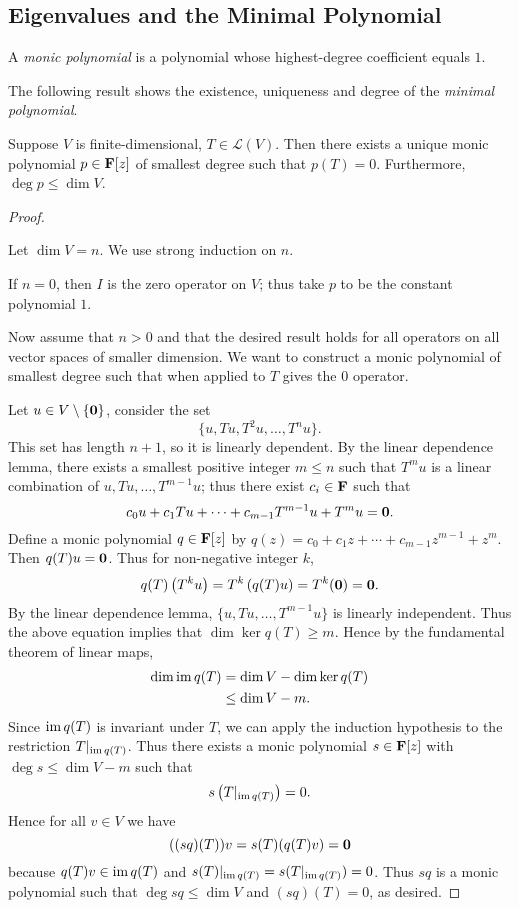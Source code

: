 \subsection{Eigenvalues and the Minimal Polynomial}
A \emph{monic polynomial} is a polynomial whose highest-degree coefficient equals $1$.

The following result shows the existence, uniqueness and degree of the \emph{minimal polynomial}.

\begin{theorem}
Suppose $V$ is finite-dimensional, $T\in\mathcal{L}(V)$. Then there exists a unique monic polynomial $p\in\mathbf F[z]$ of smallest degree such that $p(T)=0$. Furthermore, $\deg p\le\dim V$.
\end{theorem}

\begin{proof} \

 Let $\dim V=n$. We use strong induction on $n$.

If $n=0$, then $I$ is the zero operator on $V$; thus take $p$ to be the constant polynomial $1$.

Now assume that $n>0$ and that the desired result holds for all operators on all vector spaces of smaller dimension. We want to construct a monic polynomial of smallest degree such that when applied to $T$ gives the $0$ operator.

Let $u\in V\setminus\{\vb{0}\}$, consider the set
\[\{u,Tu,T^2u,\dots,T^nu\}.\]
This set has length $n+1$, so it is linearly dependent. By the linear dependence lemma, there exists a smallest positive integer $m\le n$ such that $T^mu$ is a linear combination of $u,Tu,\dots,T^{m-1}u$; thus there exist $c_i\in\mathbf F$ such that
\[c_0u+c_1Tu+\cdots+c_{m-1}T^{m-1}u+T^mu=\vb{0}.\]
Define a monic polynomial $q\in\mathbf F[z]$ by $q(z)=c_0+c_1z+\cdots+c_{m-1}z^{m-1}+z^m$. Then $q(T)u=\vb{0}$. Thus for non-negative integer $k$,
\[q(T)\left(T^ku\right)=T^k\left(q(T)u\right)=T^k(\vb{0})=\vb{0}.\]
By the linear dependence lemma, $\{u,Tu,\dots,T^{m-1}u\}$ is linearly independent. Thus the above equation implies that $\dim\ker q(T)\ge m$. Hence by the fundamental theorem of linear maps,
\begin{align*}
\dim\operatorname{im} q(T)&=\dim V-\dim\ker q(T)\\
&\le\dim V-m.
\end{align*}
Since $\operatorname{im} q(T)$ is invariant under $T$, we can apply the induction hypothesis to the restriction $T|_{\operatorname{im} q(T)}$. Thus there exists a monic polynomial $s\in\mathbf F[z]$ with $\deg s\le \dim V-m$ such that
\[s\left(T|_{\operatorname{im} q(T)}\right)=0.\]
Hence for all $v\in V$ we have
\[((sq)(T))v=s(T)(q(T)v)=\vb{0}\]
because $q(T)v\in\operatorname{im} q(T)$ and $s(T)|_{\operatorname{im} q(T)}=s(T|_{\operatorname{im} q(T)})=0$. Thus $sq$ is a monic polynomial such that $\deg sq\le\dim V$ and $(sq)(T)=0$, as desired.


\end{proof}
